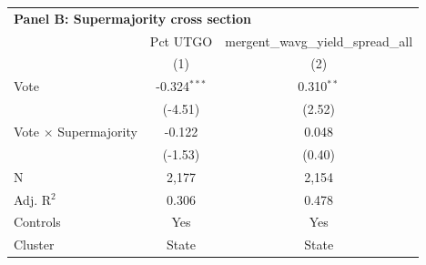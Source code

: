 \begingroup
\centering
\begin{tabular*}{\textwidth}{@{\extracolsep{\fill}}lcc}
\multicolumn{3}{l}{\textbf{Panel B: Supermajority cross section}}\\

\addlinespace
   \toprule
                                & Pct UTGO       & mergent\_wavg\_yield\_spread\_all\\      
                                & (1)            & (2)\\  
   \midrule 
   Vote                         & -0.324$^{***}$ & 0.310$^{**}$\\   
                                & (-4.51)       & (2.52)\\   
   Vote $\times$ Supermajority  & -0.122         & 0.048\\   
                                & (-1.53)       & (0.40)\\   
   \hline
   N                 & 2,177          & 2,154\\  
   Adj. R$^2$               & 0.306          & 0.478\\  
   Controls                   & Yes            & Yes\\
   Cluster              & State & State\\  
   \bottomrule
\end{tabular*}
\par\endgroup

